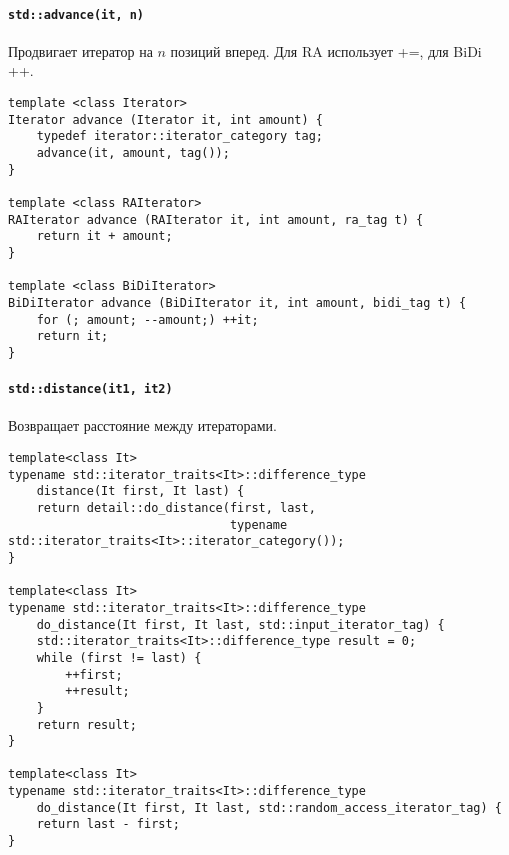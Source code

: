 \paragraph{\texttt{std::advance(it, n)}} Продвигает итератор на $ n$ позиций вперед. Для RA использует +=, для BiDi ++.
\begin{verbatim}
template <class Iterator>
Iterator advance (Iterator it, int amount) {
    typedef iterator::iterator_category tag;
	advance(it, amount, tag());
}

template <class RAIterator>
RAIterator advance (RAIterator it, int amount, ra_tag t) {
    return it + amount;
}

template <class BiDiIterator>
BiDiIterator advance (BiDiIterator it, int amount, bidi_tag t) {
    for (; amount; --amount;) ++it;
	return it;
}
\end{verbatim}
\paragraph{\texttt{std::distance(it1, it2)}} Возвращает расстояние между итераторами.
\begin{verbatim}
template<class It>
typename std::iterator_traits<It>::difference_type 
    distance(It first, It last) {
    return detail::do_distance(first, last,
                               typename std::iterator_traits<It>::iterator_category());
}

template<class It>
typename std::iterator_traits<It>::difference_type 
    do_distance(It first, It last, std::input_iterator_tag) {
    std::iterator_traits<It>::difference_type result = 0;
    while (first != last) {
        ++first;
        ++result;
    }
    return result;
}
 
template<class It>
typename std::iterator_traits<It>::difference_type 
    do_distance(It first, It last, std::random_access_iterator_tag) {
    return last - first;
}
\end{verbatim}
